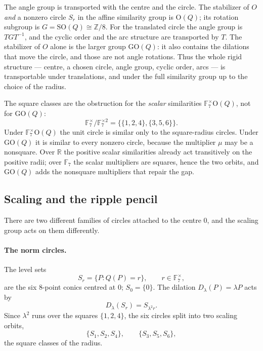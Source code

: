 \documentclass[11pt]{article}
\theoremstyle{definition}
\theoremstyle{remark}
\newcommand{\F}{\mathbb{F}}
\newcommand{\Z}{\mathbb{Z}}
\newcommand{\R}{\mathbb{R}}
\begin{document}
The angle group is transported with the centre and the circle.  The stabilizer
of $O$ \emph{and} a nonzero circle $S_r$ in the affine similarity group is
$\mathrm O(Q)$; its rotation subgroup is $G=\mathrm{SO}(Q)\cong\Z/8$.  For the
translated circle the angle group is $TGT^{-1}$, and the cyclic order and the
arc structure are transported by $T$.  The stabilizer of $O$ alone is the
larger group $\mathrm{GO}(Q)$: it also contains the dilations that move the
circle, and those are not angle rotations.  Thus the whole rigid structure ---
centre, a chosen circle, angle group, cyclic order, arcs --- is transportable
under translations, and under the full similarity group up to the choice of the
radius.

The square classes are the obstruction for the \emph{scalar} similarities
$\F_7^\times\mathrm O(Q)$, not for $\mathrm{GO}(Q)$:
\[
  \F_7^\times/\F_7^{\times2}=\{\{1,2,4\},\{3,5,6\}\}.
\]
Under $\F_7^\times\mathrm O(Q)$ the unit circle is similar only to the
square-radius circles.  Under $\mathrm{GO}(Q)$ it is similar to every nonzero
circle, because the multiplier $\mu$ may be a nonsquare.  Over $\R$ the
positive scalar similarities already act transitively on the positive radii;
over $\F_7$ the scalar multipliers are squares, hence the two orbits, and
$\mathrm{GO}(Q)$ adds the nonsquare multipliers that repair the gap.

\subsection{Scaling and the ripple pencil}
\label{subsec:ripple}

There are two different families of circles attached to the centre $0$, and the
scaling group acts on them differently.

\paragraph{The norm circles.}
The level sets
\[
  S_r=\{P:Q(P)=r\},\qquad r\in\F_7^\times,
\]
are the six $8$-point conics centred at $0$; $S_0=\{0\}$.  The dilation
$D_\lambda(P)=\lambda P$ acts by
\[
  D_\lambda(S_r)=S_{\lambda^2r}.
\]
Since $\lambda^2$ runs over the squares $\{1,2,4\}$, the six circles split into
two scaling orbits,
\[
  \{S_1,S_2,S_4\},\qquad \{S_3,S_5,S_6\},
\]
the square classes of the radius.
\end{document}
